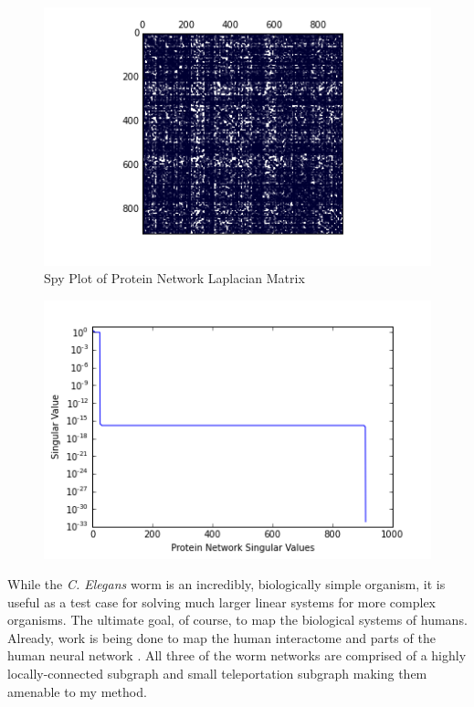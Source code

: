 \documentclass{article}
\begin{document}
\begin{figure}
\centering
\includegraphics[width = \linewidth]{genespy.png}
\caption{Spy Plot of Protein Network Laplacian Matrix}
\end{figure}
\begin{figure}
\centering
\includegraphics[width = \linewidth]{proteinsing.png}
\end{figure}

While the \textit{C. Elegans} worm is an incredibly, biologically simple organism, it is useful as a test case for solving much larger linear systems for more complex organisms. The ultimate goal, of course, to map the biological systems of humans. Already, work is being done to map the human interactome \cite{Rual:2005,Rolland:2014} and parts of the human neural network \cite{Toga:2012}. All three of the worm networks are comprised of a highly locally-connected subgraph and small teleportation subgraph making them amenable to my method. 
\end{document}
